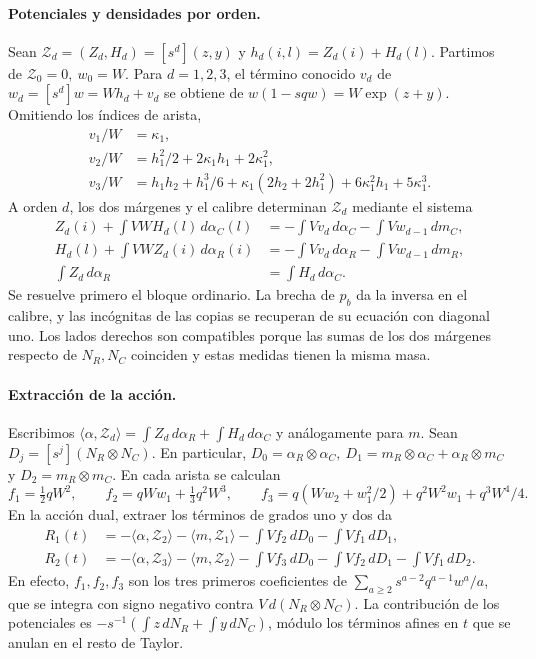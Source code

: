 \paragraph{Potenciales y densidades por orden.}
Sean \(\mathcal Z_d=(Z_d,H_d)=[s^d](z,y)\) y \(h_d(i,l)=Z_d(i)+H_d(l)\).
Partimos de \(\mathcal Z_0=0,\ w_0=W\). Para \(d=1,2,3\), el término conocido \(v_d\) de
\(w_d=[s^d]w=Wh_d+v_d\) se obtiene de \(w(1-sqw)=W\exp(z+y)\).
Omitiendo los índices de arista,
\begin{align*}
 v_1/W&=\kappa_1,\\
 v_2/W&=h_1^2/2+2\kappa_1 h_1+2\kappa_1^2,\\
 v_3/W&=h_1h_2+h_1^3/6+\kappa_1(2h_2+2h_1^2)+6\kappa_1^2h_1+5\kappa_1^3 .
\end{align*}
A orden \(d\), los dos márgenes y el calibre determinan \(\mathcal Z_d\) mediante el sistema
\begin{align*}
 Z_d(i)+\int VW H_d(l)\,d\alpha_C(l)
   &=-\int Vv_d\,d\alpha_C-\int Vw_{d-1}\,dm_C ,\\
 H_d(l)+\int VW Z_d(i)\,d\alpha_R(i)
   &=-\int Vv_d\,d\alpha_R-\int Vw_{d-1}\,dm_R ,\\
 \int Z_d\,d\alpha_R&=\int H_d\,d\alpha_C .
\end{align*}
Se resuelve primero el bloque ordinario. La brecha de \(p_b\) da la inversa en el calibre,
y las incógnitas de las copias se recuperan de su ecuación con diagonal uno.
Los lados derechos son compatibles porque las sumas de los dos márgenes respecto
de \(N_R,N_C\) coinciden y estas medidas tienen la misma masa.

\paragraph{Extracción de la acción.}
Escribimos \(\langle\alpha,\mathcal Z_d\rangle=\int Z_d\,d\alpha_R+\int H_d\,d\alpha_C\)
y análogamente para \(m\). Sean \(D_j=[s^j](N_R\otimes N_C)\). En particular,
\(D_0=\alpha_R\otimes\alpha_C,\ D_1=m_R\otimes\alpha_C+\alpha_R\otimes m_C\) y
\(D_2=m_R\otimes m_C\). En cada arista se calculan
\[
 f_1=\tfrac12 qW^2,\qquad f_2=qWw_1+\tfrac13q^2W^3,\qquad
 f_3=q(Ww_2+w_1^2/2)+q^2W^2w_1+q^3W^4/4 .
\]
En la acción dual, extraer los términos de grados uno y dos da
\begin{align*}
 R_1(t)&=-\langle\alpha,\mathcal Z_2\rangle-\langle m,\mathcal Z_1\rangle
          -\int Vf_2\,dD_0-\int Vf_1\,dD_1,\\
 R_2(t)&=-\langle\alpha,\mathcal Z_3\rangle-\langle m,\mathcal Z_2\rangle
          -\int Vf_3\,dD_0-\int Vf_2\,dD_1-\int Vf_1\,dD_2 .
\end{align*}
En efecto, \(f_1,f_2,f_3\) son los tres primeros coeficientes de
\(\sum_{a\ge2}s^{a-2}q^{a-1}w^a/a\), que se integra con signo negativo contra
\(V\,d(N_R\otimes N_C)\). La contribución de los potenciales es
\(-s^{-1}(\int z\,dN_R+\int y\,dN_C)\), módulo los términos afines en \(t\)
que se anulan en el resto de Taylor.
